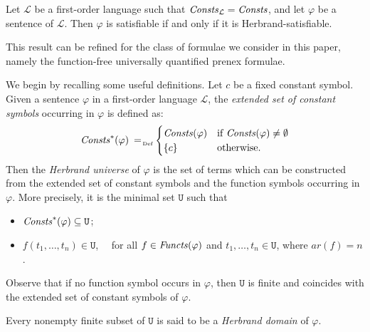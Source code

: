 \documentclass[manyauthors]{fundam}
\newcommand{\Lang}{\ensuremath{\mathcal{L}\xspace}} %
\newcommand{\LangConsts}{\Consts_{\Lang}}
\newcommand{\Univ}{\mathtt{U}}
\newcommand{\ar}{\mathit{ar}}
\begin{document}
\begin{theorem}\label{HERSENT}
Let $\Lang$ be a first-order
language such that $\LangConsts=\Consts$, and let $\varphi$ be a sentence of
$\Lang$.
Then $\varphi$ is satisfiable if and only if it is Herbrand-satisfiable.
\end{theorem}
%
This result can be 
refined for the class of formulae we consider in this paper, namely the
function-free
universally quantified prenex formulae.

We begin by recalling some useful
definitions. Let $c$ be a fixed constant symbol. Given a sentence 
$\varphi$ in a first-order language $\Lang$, the \emph{extended set 
of constant symbols} occurring in $\varphi$ is defined as:
\[
\Consts^*(\varphi) \defAs
\begin{cases}
\Consts(\varphi) & \text{if } \Consts(\varphi) \neq \emptyset\\
\{c\} & \text{otherwise.}
\end{cases}
\]
Then the \emph{Herbrand universe} of $\varphi$ is the set of terms which can
be constructed from the extended set of constant symbols and the 
function symbols occurring in $\varphi$.
More precisely, it is the minimal set $\Univ$ such that
\begin{itemize}
\item $\Consts^*(\varphi) \subseteq \Univ$;
%

\item $f(t_1, \ldots, t_n) \in \Univ$, ~~for all $f \in 
\mathit{Functs}(\varphi)$ and $t_1, \ldots, t_n \in \Univ$, where $\ar(f)=n$.
\end{itemize}
Observe that if no function symbol occurs in $\varphi$, then $\Univ$ 
is finite and coincides with the extended set of constant symbols of 
$\varphi$.

Every nonempty finite subset of $\Univ$ is said to be a
\emph{Herbrand domain} of $\varphi$.
\end{document}
